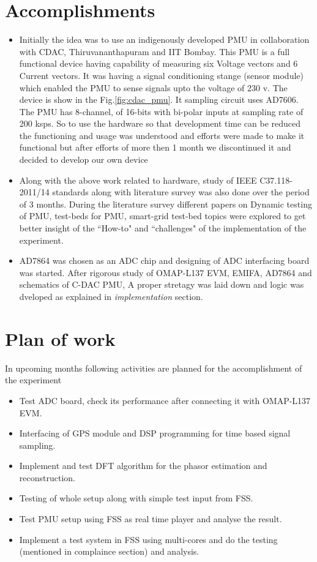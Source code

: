 
\section{Accomplishments}
\begin{itemize}
\item Initially the idea was to use an indigenously developed PMU in collaboration with CDAC, Thiruvananthapuram and IIT Bombay. This PMU is a full functional device having capability of measuring six Voltage vectors and 6 Current vectors. It was having a signal conditioning stange (sensor module) which enabled the PMU to sense signals upto the voltage of 230 v. The device is show in the Fig.\ref{fig:cdac_pmu}. It sampling circuit uses AD7606. The PMU has 8-channel, of 16-bits with bi-polar inputs at sampling rate of 200 ksps. So to use the hardware so that development time can be reduced the functioning and usage was understood and efforts were made to make it functional but after efforts of more then 1 month we discontinued it and decided to develop our own device

\item Along with the above work related to hardware, study of IEEE C37.118-2011/14 standards along with literature survey was also done over the period of 3 months. During the literature survey different papers on Dynamic testing of PMU, test-beds for PMU, smart-grid test-bed topics were explored to get better insight of the ``How-to" and ``challenges" of the implementation of the experiment.

\item AD7864 was chosen as an ADC chip and designing of ADC interfacing board was started. After rigorous study of OMAP-L137 EVM, EMIFA, AD7864 and schematics of C-DAC PMU, A proper stretagy was laid down and logic was dveloped as explained in \textit{implementation} section.   
\end{itemize}


\section{Plan of work}
In upcoming months following activities are planned for the accomplishment of the experiment
\begin{itemize}
\item Test ADC board, check its performance after connecting it with OMAP-L137 EVM.
\item Interfacing of GPS module and DSP programming for time based signal sampling.
\item Implement and test DFT algorithm for the phasor estimation and reconstruction.
\item Testing of whole setup along with simple test input from FSS.
\item Test PMU setup using FSS as real time player and analyse the result.
\item Implement a test system in FSS using multi-cores and do the testing (mentioned in complaince section) and analysis.
\end{itemize}

